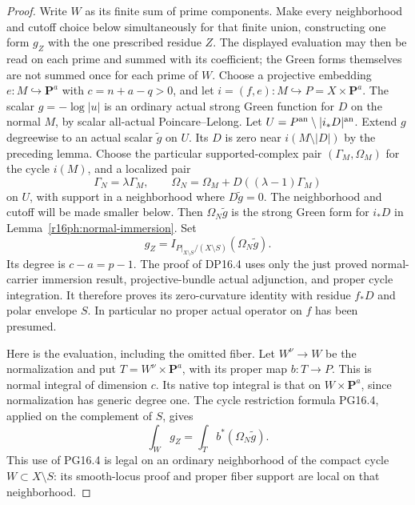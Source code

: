 \documentclass[11pt,a4paper]{article}
\theoremstyle{definition}
\theoremstyle{remark}
\numberwithin{equation}{section}
\begin{document}
\begin{proof}
Write $W$ as its finite sum of prime components.  Make every
neighborhood and cutoff choice below simultaneously for that finite
union, constructing one form $g_Z$ with the one prescribed residue
$Z$.  The displayed evaluation may then be read on each prime and
summed with its coefficient; the Green forms themselves are not
summed once for each prime of $W$.  Choose a projective
embedding $e:M\hookrightarrow\mathbf P^a$ with
$c=n+a-q>0$, and let $i=(f,e):M\hookrightarrow P=X\times\mathbf P^a$.
The scalar $g=-\log|u|$ is an ordinary actual strong Green function
for $D$ on the normal $M$, by scalar all-actual Poincare--Lelong.
Let $U=P^{\rm an}\setminus|i_*D|^{\rm an}$.
Extend $g$ degreewise to an actual scalar $\widetilde g$ on $U$.
Its $D$ is zero near $i(M\setminus|D|)$ by the preceding lemma.
Choose the particular supported-complex pair $(\Gamma_M,\Omega_M)$
for the cycle $i(M)$, and a localized pair
\[
 \Gamma_N=\lambda\Gamma_M,\qquad
 \Omega_N=\Omega_M+D((\lambda-1)\Gamma_M)
 \tag{PH16.3}\label{r16ph:localized}
\]
on $U$, with support in a neighborhood where $D\widetilde g=0$.
The neighborhood and cutoff will be made smaller below.
Then $\Omega_N\widetilde g$ is the strong Green form for $i_*D$
in Lemma~\ref{r16ph:normal-immersion}.  Set
\[
 g_Z=I_{P|_{X\setminus S}/(X\setminus S)}
                  (\Omega_N\widetilde g).
 \tag{PH16.4}\label{r16ph:bundle-output}
\]
Its degree is $c-a=p-1$.  The proof of DP16.4 uses only the
just proved normal-carrier immersion result, projective-bundle
actual adjunction, and proper cycle integration.  It therefore
proves its zero-curvature identity with residue $f_*D$ and polar
envelope $S$.  In particular no proper actual operator on $f$
has been presumed.

Here is the evaluation, including the omitted fiber.
Let $W^\nu\to W$ be the normalization and put
$T=W^\nu\times\mathbf P^a$, with its proper map $b:T\to P$.
This is normal integral of dimension $c$.  Its native top integral
is that on $W\times\mathbf P^a$, since normalization has generic
degree one.  The cycle restriction formula PG16.4, applied on
the complement of $S$, gives
\[
          \int_W g_Z=\int_T b^*(\Omega_N\widetilde g).
 \tag{PH16.5}\label{r16ph:top-evaluation}
\]
This use of PG16.4 is legal on an ordinary neighborhood of the
compact cycle $W\subset X\setminus S$: its smooth-locus proof
and proper fiber support are local on that neighborhood.


\end{proof}
\end{document}
